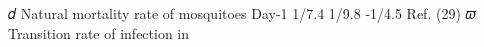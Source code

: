 𝑑 Natural mortality rate of
mosquitoes  Day-1 1/7.4  1/9.8 -1/4.5  Ref. (29)
𝜛 Transition rate of infection in